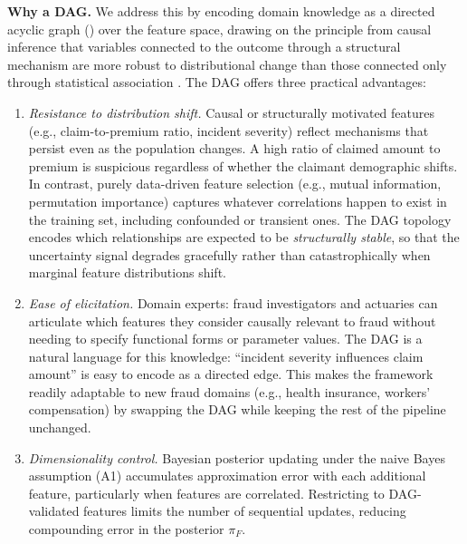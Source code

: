 \textbf{Why a DAG.} We address this by encoding domain knowledge as a directed acyclic graph () over the feature space, drawing on the principle from causal inference that variables connected to the outcome through a structural mechanism are more robust to distributional change than those connected only through statistical association \citep{pearl2009causality, peters2016causal, scholkopf2021toward}. The DAG offers three practical advantages:
\begin{enumerate}[nosep,leftmargin=*]
    \item \textit{Resistance to distribution shift.} Causal or structurally motivated features (e.g., claim-to-premium ratio, incident severity) reflect mechanisms that persist even as the population changes. A high ratio of claimed amount to premium is suspicious regardless of whether the claimant demographic shifts. In contrast, purely data-driven feature selection (e.g., mutual information, permutation importance) captures whatever correlations happen to exist in the training set, including confounded or transient ones. The DAG topology encodes which relationships are expected to be \textit{structurally stable}, so that the uncertainty signal degrades gracefully rather than catastrophically when marginal feature distributions shift.
    \item \textit{Ease of elicitation.} Domain experts: fraud investigators and actuaries can articulate which features they consider causally relevant to fraud without needing to specify functional forms or parameter values. The DAG is a natural language for this knowledge: ``incident severity influences claim amount'' is easy to encode as a directed edge. This makes the framework readily adaptable to new fraud domains (e.g., health insurance, workers' compensation) by swapping the DAG while keeping the rest of the pipeline unchanged.
    \item \textit{Dimensionality control.} Bayesian posterior updating under the naive Bayes assumption (A1) accumulates approximation error with each additional feature, particularly when features are correlated. Restricting to DAG-validated features limits the number of sequential updates, reducing compounding error in the posterior $\pi_F$.
\end{enumerate}

